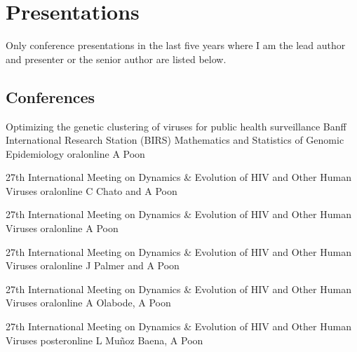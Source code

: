 
\section {Presentations}

Only conference presentations in the last five years where I am the lead author and presenter or the senior author are listed below.

\subsection {Conferences}

{Optimizing the genetic clustering of viruses for public health surveillance}
{Banff International Research Station (BIRS) Mathematics and Statistics of Genomic Epidemiology}
{oral}{online}
{A Poon}{}

{27th International Meeting on Dynamics \& Evolution of HIV and Other Human Viruses}
{oral}{online}
{C Chato and A Poon}{}

{27th International Meeting on Dynamics \& Evolution of HIV and Other Human Viruses}
{oral}{online}
{A Poon}{}

{27th International Meeting on Dynamics \& Evolution of HIV and Other Human Viruses}
{oral}{online}
{J Palmer and A Poon}{}

{27th International Meeting on Dynamics \& Evolution of HIV and Other Human Viruses}
{oral}{online}
{A Olabode, A Poon}{}

{27th International Meeting on Dynamics \& Evolution of HIV and Other Human Viruses}
{poster}{online}
{L Mu\~noz Baena, A Poon}{}



